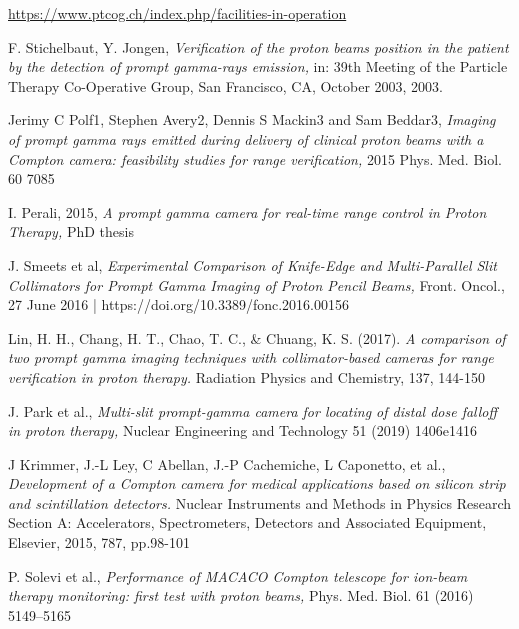 \documentclass[11pt,a4paper]{article}
\begin{document}
\begin{thebibliography}{9}
\url{https://www.ptcog.ch/index.php/facilities-in-operation}


F. Stichelbaut, Y. Jongen, \emph{Verification of the proton beams position in the patient by the detection of prompt gamma-rays emission,} in: 39th Meeting of the Particle Therapy Co-Operative Group, San Francisco, CA, October 2003, 2003.

Jerimy C Polf1, Stephen Avery2, Dennis S Mackin3 and Sam Beddar3, \emph{Imaging of prompt gamma rays emitted during delivery of clinical proton beams with a Compton camera: feasibility studies for range verification,} 2015 Phys. Med. Biol. 60 7085

I. Perali, 2015, \emph{A prompt gamma camera for real-time range control in Proton Therapy,} PhD thesis


J. Smeets et al, \emph{Experimental Comparison of Knife-Edge and Multi-Parallel Slit Collimators for Prompt Gamma Imaging of Proton Pencil Beams,} Front. Oncol., 27 June 2016 | https://doi.org/10.3389/fonc.2016.00156

Lin, H. H., Chang, H. T., Chao, T. C., \& Chuang, K. S. (2017). \emph{A comparison of two prompt gamma imaging techniques with collimator-based cameras for range verification in proton therapy.} Radiation Physics and Chemistry, 137, 144-150

J. Park et al.,  \emph{Multi-slit prompt-gamma camera for locating of distal dose falloff in proton therapy,} Nuclear Engineering and Technology 51 (2019) 1406e1416 

J Krimmer, J.-L Ley, C Abellan, J.-P Cachemiche, L Caponetto, et al., \emph{Development of a Compton camera for medical applications based on silicon strip and scintillation detectors.} Nuclear Instruments and Methods in Physics Research Section A: Accelerators, Spectrometers, Detectors and Associated Equipment, Elsevier, 2015, 787, pp.98-101 

P. Solevi et al., \emph{Performance of MACACO Compton telescope for ion-beam therapy monitoring: first test with proton beams,} Phys. Med. Biol. 61 (2016) 5149–5165


\end{thebibliography}
\end{document}
